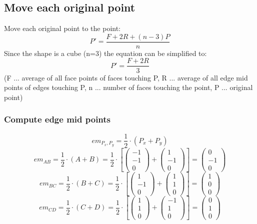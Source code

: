 \documentclass{article}
\begin{document}
\subsection{Move each original point}
Move each original point to the point:\[P'=\frac{F+2R+(n-3)P}{n}\]
Since the shape is a cube (n=3) the equation can be simplified to:\[P'=\frac{F+2R}{3}\]
(F ... average of all face points of faces touching P, R ... average of all edge mid points of edges touching P, n ... number of faces touching the point, P ... original point)

\subsubsection{Compute edge mid points}
\[em_{P_x,P_y}=\frac{1}{2}\cdot(P_x+P_y)\]
\[em_{AB}=\frac{1}{2}\cdot(A+B)=\frac{1}{2}\cdot\left[
\left({\begin{array}{c} -1 \\  -1 \\ 0 \end{array}}\right)+
\left({\begin{array}{c} 1 \\  -1 \\ 0 \end{array}}\right)\right]=
\left({\begin{array}{c}  0 \\ -1 \\ 0 \end{array}}\right)
\]
\[em_{BC}=\frac{1}{2}\cdot(B+C)=\frac{1}{2}\cdot\left[
\left({\begin{array}{c} 1 \\  -1 \\ 0 \end{array}}\right)+
\left({\begin{array}{c} 1 \\  1 \\ 0 \end{array}}\right)\right]=
\left({\begin{array}{c}  1 \\ 0 \\ 0 \end{array}}\right)
\]
\[em_{CD}=\frac{1}{2}\cdot(C+D)=\frac{1}{2}\cdot\left[
\left({\begin{array}{c} 1 \\  1 \\ 0 \end{array}}\right)+
\left({\begin{array}{c} -1 \\  1 \\ 0 \end{array}}\right)\right]=
\left({\begin{array}{c}  0 \\ 1 \\ 0 \end{array}}\right)
\]
\end{document}
